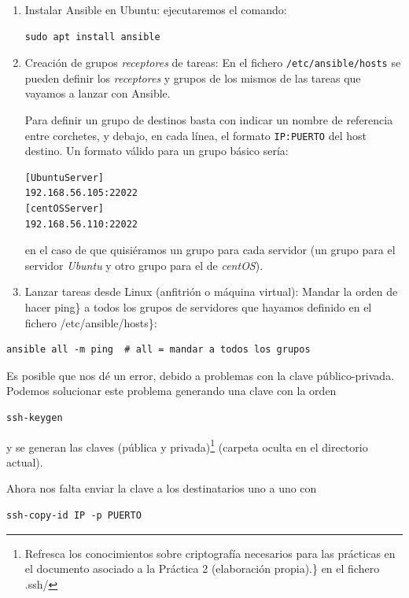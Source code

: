 \documentclass[
]{memoir}
\begin{document}
\begin{enumerate}
\def\labelenumi{\arabic{enumi}.}
\item
  Instalar Ansible en Ubuntu: ejecutaremos el comando:

\begin{verbatim}
sudo apt install ansible
\end{verbatim}
\item
  Creación de grupos \emph{receptores} de tareas: En el fichero \texttt{/etc/ansible/hosts} se pueden definir los \emph{receptores} y grupos de los mismos de las tareas que vayamos a lanzar con Ansible.

  Para definir un grupo de destinos basta con indicar un nombre de referencia entre corchetes, y debajo, en cada línea, el formato \texttt{IP:PUERTO} del host destino. Un formato válido para un grupo básico sería:

\begin{verbatim}
[UbuntuServer]
192.168.56.105:22022
[centOSServer]
192.168.56.110:22022
\end{verbatim}

  en el caso de que quisiéramos un grupo para cada servidor (un grupo para el servidor \emph{Ubuntu} y otro grupo para el de \emph{centOS}).
\item
  Lanzar tareas desde Linux (anfitrión o máquina virtual): Mandar la orden de hacer ping\} a todos los grupos de servidores que hayamos definido en el fichero /etc/ansible/hosts\}:
\end{enumerate}

\begin{verbatim}
ansible all -m ping  # all = mandar a todos los grupos
\end{verbatim}

Es posible que nos dé un error, debido a problemas con la clave público-privada. Podemos solucionar este problema generando una clave con la orden

\begin{verbatim}
ssh-keygen
\end{verbatim}

y se generan las claves (pública y privada)\footnote{Refresca los conocimientos sobre criptografía necesarios para las prácticas en el documento asociado a la Práctica 2 (elaboración propia).\} en el fichero .ssh/} (carpeta oculta en el directorio actual).

Ahora nos falta enviar la clave a los destinatarios uno a uno con

\begin{verbatim}
ssh-copy-id IP -p PUERTO
\end{verbatim}
\end{document}
